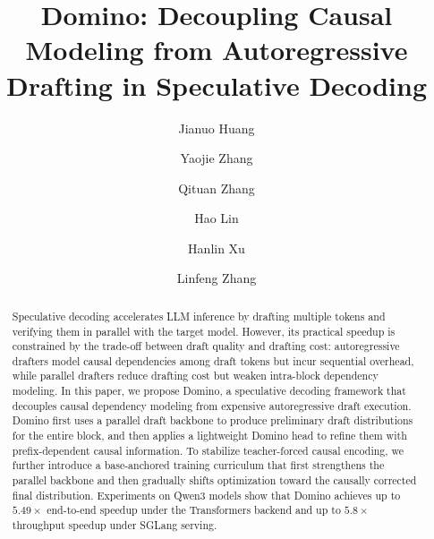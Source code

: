 \documentclass{llmxive}
\title{Domino: Decoupling Causal Modeling from Autoregressive Drafting in Speculative Decoding}
\author{Jianuo Huang \and Yaojie Zhang \and Qituan Zhang \and Hao Lin \and Hanlin Xu \and Linfeng Zhang}
\begin{document}
\maketitle
\begin{abstract}
Speculative decoding accelerates LLM inference by drafting multiple tokens and verifying them in parallel with the target model. However, its practical speedup is constrained by the trade-off between draft quality and drafting cost: autoregressive drafters model causal dependencies among draft tokens but incur sequential overhead, while parallel drafters reduce drafting cost but weaken intra-block dependency modeling. In this paper, we propose Domino, a speculative decoding framework that decouples causal dependency modeling from expensive autoregressive draft execution. Domino first uses a parallel draft backbone to produce preliminary draft distributions for the entire block, and then applies a lightweight Domino head to refine them with prefix-dependent causal information. To stabilize teacher-forced causal encoding, we further introduce a base-anchored training curriculum that first strengthens the parallel backbone and then gradually shifts optimization toward the causally corrected final distribution. Experiments on Qwen3 models show that Domino achieves up to \(5.49\times\) end-to-end speedup under the Transformers backend and up to \(5.8\times\) throughput speedup under SGLang serving.
\end{abstract}
%   


\vspace{-4mm}
\end{document}
